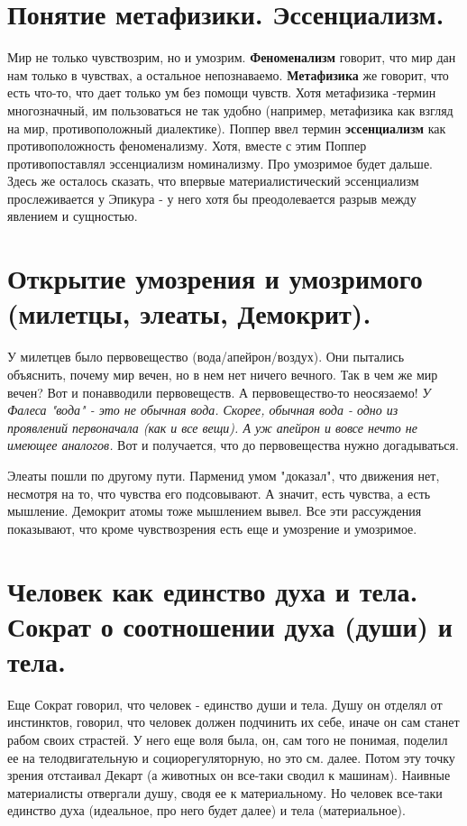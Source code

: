 \section{ Понятие метафизики. Эссенциализм.}
Мир не только чувствозрим, но и умозрим. \textbf{Феноменализм} говорит, что мир дан нам только в чувствах, а остальное непознаваемо. \textbf{Метафизика} же  говорит, что есть что-то, что дает только ум без помощи чувств. Хотя метафизика -термин многозначный, им пользоваться не так удобно (например, метафизика как взгляд на мир, противоположный диалектике). Поппер ввел термин \textbf{эссенциализм} как противоположность феноменализму. Хотя, вместе с этим Поппер противопоставлял эссенциализм номинализму. Про умозримое будет дальше. Здесь же осталось сказать, что впервые материалистический эссенциализм прослеживается у Эпикура - у него хотя бы преодолевается разрыв между явлением и сущностью.

\section{ Открытие умозрения и умозримого (милетцы, элеаты, Демокрит).}
У милетцев было первовещество (вода/апейрон/воздух). Они пытались объяснить, почему мир вечен, но в нем нет ничего вечного. Так в чем же мир вечен? Вот и понавводили первовеществ. А первовещество-то неосязаемо! \textit{У Фалеса "вода" - это не обычная вода. Скорее, обычная вода - одно из проявлений первоначала (как и все вещи). А уж апейрон и вовсе нечто не имеющее аналогов.} Вот и получается, что до первовещества нужно догадываться.

Элеаты пошли по другому пути. Парменид умом "доказал", что движения нет, несмотря на то, что чувства его подсовывают. А значит, есть чувства, а есть мышление. Демокрит атомы тоже мышлением вывел. Все эти рассуждения показывают, что кроме чувствозрения есть еще и умозрение и умозримое.

\section{ Человек как единство духа и тела. Сократ о соотношении духа (души) и тела.}
Еще Сократ говорил, что человек - единство души и тела. Душу он отделял от инстинктов, говорил, что человек должен подчинить их себе, иначе он сам станет рабом своих страстей. У него еще воля была, он, сам того не понимая, поделил ее на телодвигательную и социорегуляторную, но это см. далее. Потом эту точку зрения отстаивал Декарт (а животных он все-таки сводил к машинам). Наивные материалисты отвергали душу, сводя ее к материальному. Но человек все-таки единство духа (идеальное, про него будет далее) и тела (материальное). 

